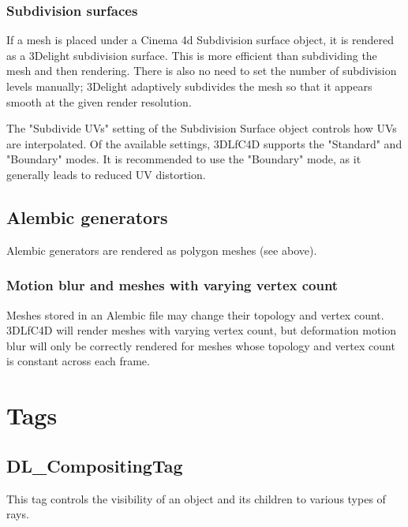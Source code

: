 \documentclass{book}
\begin{document}
\subsubsection{Subdivision surfaces}
If a mesh is placed under a Cinema 4d Subdivision surface object, it is rendered as a 3Delight subdivision surface. This is more efficient than subdividing the mesh and then rendering. There is also no need to set the number of subdivision levels manually; 3Delight adaptively subdivides the mesh so that it appears smooth at the given render resolution. 

The "Subdivide UVs" setting of the Subdivision Surface object controls how UVs are interpolated. Of the available settings, 3DLfC4D supports the "Standard" and "Boundary" modes. It is recommended to use the "Boundary" mode, as it generally leads to reduced UV distortion. 

\subsection{Alembic generators}
Alembic generators are rendered as polygon meshes (see above). 

\subsubsection{Motion blur and meshes with varying vertex count}
Meshes stored in an Alembic file may change their topology and vertex count. 3DLfC4D will render meshes with varying vertex count, but deformation motion blur will only be correctly rendered for meshes whose topology and vertex count is constant across each frame. 




\section{Tags}
\subsection{DL\_CompositingTag}
This tag controls the visibility of an object and its children to various types of rays. 
\end{document}
